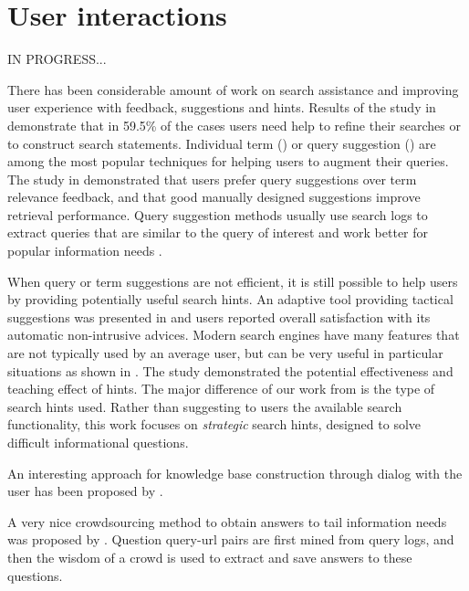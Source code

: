 \section{User interactions}

IN PROGRESS...


There has been considerable amount of work on search assistance and improving user experience with feedback, suggestions and hints.
Results of the study in \cite{xie2009understanding} demonstrate that in 59.5\% of the cases users need help to refine their searches or to construct search statements.
Individual term (\cite{ruthven2003survey}) or query suggestion (\cite{Bhatia:2011:QSA:2009916.2010023, Cao:2008:CQS:1401890.1401995,Jones:2006:GQS:1135777.1135835}) are among the most popular techniques for helping users to augment their queries.
The study in \cite{Kelly:2009:CQT:1571941.1572006} demonstrated that users prefer query suggestions over term relevance feedback, and that good manually designed suggestions improve retrieval performance.
Query suggestion methods usually use search logs to extract queries that are similar to the query of interest and work better for popular information needs \cite{Bhatia:2011:QSA:2009916.2010023}.

When query or term suggestions are not efficient, it is still possible to help users by providing potentially useful search hints.
An adaptive tool providing tactical suggestions was presented in \cite{Kriewel2010} and users reported overall satisfaction with its automatic non-intrusive advices.
Modern search engines have many features that are not typically used by an average user, but can be very useful in particular situations as shown in \cite{Moraveji:2011:MIU:2009916.2009966}. The study demonstrated the potential effectiveness and teaching effect of hints.
The major difference of our work from \cite{Moraveji:2011:MIU:2009916.2009966} is the type of search hints used.
Rather than suggesting to users the available search functionality, this work focuses on {\em strategic} search hints, designed to solve difficult informational questions.


An interesting approach for knowledge base construction through dialog with the user has been proposed by \cite{hixon2015learning}.

A very nice crowdsourcing method to obtain answers to tail information needs was proposed by \cite{bernstein2012direct}.
Question query-url pairs are first mined from query logs, and then the wisdom of a crowd is used to extract and save answers to these questions.

